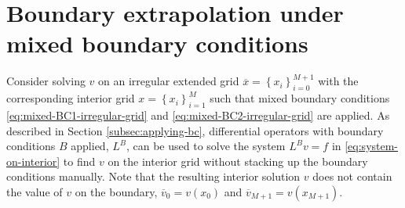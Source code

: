 \documentclass[11pt]{article}
\newcommand{\set}[1]{\ensuremath{\left\{{#1}\right\}}}
\theoremstyle{definition}
\begin{document}
\section{Boundary extrapolation under mixed boundary conditions}
Consider solving $v$ on an irregular extended grid $\overline{x} = \set{x_i}_{i=0}^{M+1}$ with the corresponding interior grid $x = \set{x_i}_{i=1}^M $ such that mixed boundary conditions \eqref{eq:mixed-BC1-irregular-grid} and \eqref{eq:mixed-BC2-irregular-grid} are applied. As described in Section \ref{subsec:applying-bc}, differential operators with boundary conditions $B$ applied, $L^B$, can be used to solve the system $L^B v = f$ in \eqref{eq:system-on-interior} to find $v$ on the interior grid without stacking up the boundary conditions manually. Note that the resulting interior solution $v$ does not contain the value of $v$ on the boundary, $\overline{v}_0 = v(x_0)$ and $\overline{v}_{M+1} = v(x_{M+1})$. 
\end{document}
